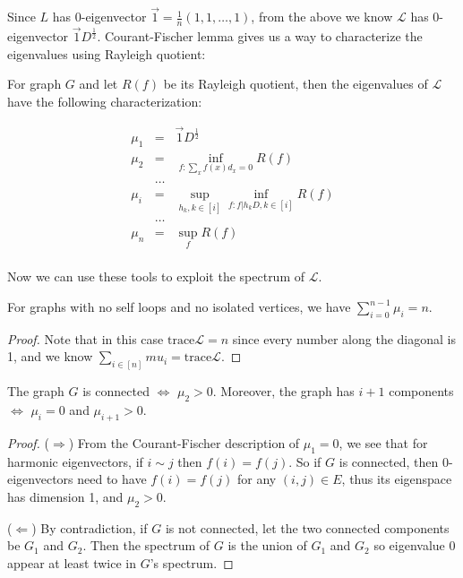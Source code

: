 Since $L$ has 0-eigenvector $\overrightarrow{1}=\frac{1}{n}(1, 1,
\dots, 1)$, from the above we know $\mathcal{L}$ has 0-eigenvector
$\overrightarrow{1}D^{\frac{1}{2}}$. Courant-Fischer lemma gives us
a way to characterize the eigenvalues using Rayleigh quotient:

\begin{proposition}
For graph $G$ and let $R(f)$ be its Rayleigh quotient, then the
eigenvalues of $\mathcal{L}$ have the following characterization:

\begin{eqnarray*}
\mu_1 & = &  \overrightarrow{1}D^{\frac{1}{2}}\\
\mu_2 & = &  \inf_{f: \sum_x f(x)d_x=0}R(f)\\
&\dots& \\
\mu_i & = & \sup_{h_k, k\in[i]} \inf_{f: f \vert h_k D, k\in[i]} R(f)\\
&\dots& \\
\mu_n & = & \sup_f R(f)\\
\end{eqnarray*}
\end{proposition}

Now we can use these tools to exploit the spectrum of $\mathcal{L}$.

\begin{fact}
For graphs with no self loops and no isolated vertices, we have
$\sum_{i=0}^{n-1} \mu_i=n.$
\end{fact}

\begin{proof}
Note that in this case $\text{trace}\mathcal{L}=n$ since every
number along the diagonal is 1, and we know $\sum_{i\in[n]}
mu_i=\text{trace}\mathcal{L}. $
\end{proof}

\begin{fact} \label{connected}
The graph $G$ is connected $\Leftrightarrow$ $\mu_2>0$. Moreover,
the graph has $i+1$ components $\Leftrightarrow$ $\mu_i=0$ and
$\mu_{i+1}>0$.
\end{fact}

\begin{proof}
($\Rightarrow$) From the Courant-Fischer description of $\mu_1=0$,
we see that for harmonic eigenvectors, if $i\sim j$ then
$f(i)=f(j)$. So if $G$ is connected, then 0-eigenvectors need to
have $f(i)=f(j)$ for any $(i, j)\in E$, thus its eigenspace has
dimension 1, and $\mu_2>0$.

($\Leftarrow$) By contradiction, if $G$ is not connected, let the
two connected components be $G_1$ and $G_2$. Then the spectrum of
$G$ is the union of $G_1$ and $G_2$ so eigenvalue 0 appear at least
twice in $G$'s spectrum.
\end{proof}

